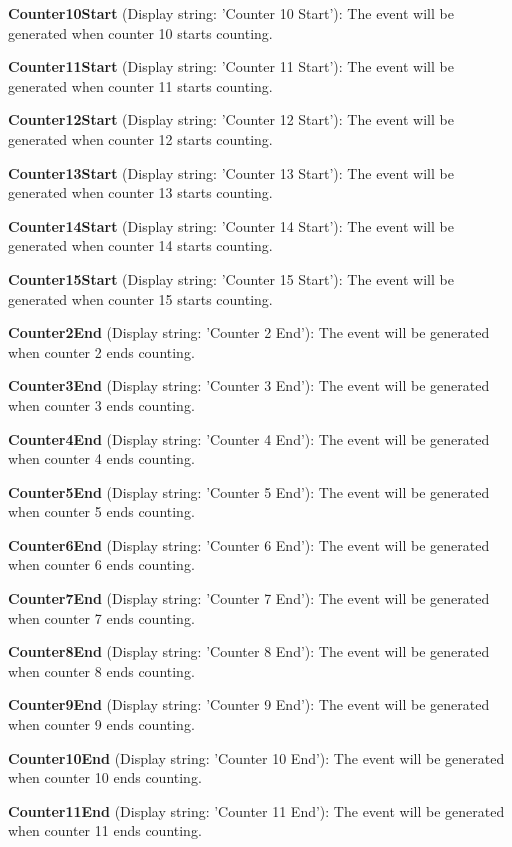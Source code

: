 \begin{DoxyItemize}
\item {\bfseries Counter10\+Start} (Display string\+: 'Counter 10 Start')\+: The event will be generated when counter 10 starts counting.
\item {\bfseries Counter11\+Start} (Display string\+: 'Counter 11 Start')\+: The event will be generated when counter 11 starts counting.
\item {\bfseries Counter12\+Start} (Display string\+: 'Counter 12 Start')\+: The event will be generated when counter 12 starts counting.
\item {\bfseries Counter13\+Start} (Display string\+: 'Counter 13 Start')\+: The event will be generated when counter 13 starts counting.
\item {\bfseries Counter14\+Start} (Display string\+: 'Counter 14 Start')\+: The event will be generated when counter 14 starts counting.
\item {\bfseries Counter15\+Start} (Display string\+: 'Counter 15 Start')\+: The event will be generated when counter 15 starts counting.
\item {\bfseries Counter2\+End} (Display string\+: 'Counter 2 End')\+: The event will be generated when counter 2 ends counting.
\item {\bfseries Counter3\+End} (Display string\+: 'Counter 3 End')\+: The event will be generated when counter 3 ends counting.
\item {\bfseries Counter4\+End} (Display string\+: 'Counter 4 End')\+: The event will be generated when counter 4 ends counting.
\item {\bfseries Counter5\+End} (Display string\+: 'Counter 5 End')\+: The event will be generated when counter 5 ends counting.
\item {\bfseries Counter6\+End} (Display string\+: 'Counter 6 End')\+: The event will be generated when counter 6 ends counting.
\item {\bfseries Counter7\+End} (Display string\+: 'Counter 7 End')\+: The event will be generated when counter 7 ends counting.
\item {\bfseries Counter8\+End} (Display string\+: 'Counter 8 End')\+: The event will be generated when counter 8 ends counting.
\item {\bfseries Counter9\+End} (Display string\+: 'Counter 9 End')\+: The event will be generated when counter 9 ends counting.
\item {\bfseries Counter10\+End} (Display string\+: 'Counter 10 End')\+: The event will be generated when counter 10 ends counting.
\item {\bfseries Counter11\+End} (Display string\+: 'Counter 11 End')\+: The event will be generated when counter 11 ends counting.

\end{DoxyItemize}
